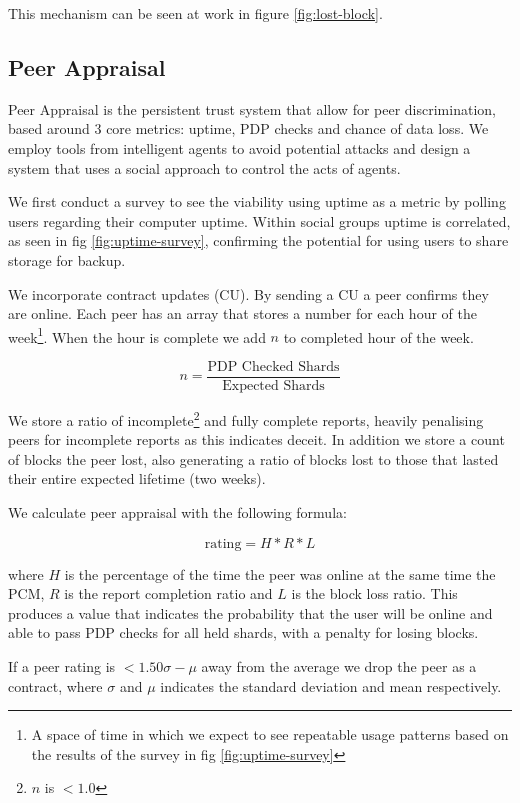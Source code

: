 \documentclass[11pt, a4paper, twocolumn, twoside]{report}
\begin{document}
This mechanism can be seen at work in figure \ref{fig:lost-block}.

\subsection{Peer Appraisal} \label{sec:peerAppraisal}

Peer Appraisal is the persistent trust system that allow for peer discrimination, based around 3 core metrics: uptime, PDP checks and chance of data loss. We employ tools from intelligent agents to avoid potential attacks and design a system that uses a social approach \citep{pinyol2013computational} to control the acts of agents.

We first conduct a survey to see the viability using uptime as a metric by polling users regarding their computer uptime. Within social groups uptime is correlated, as seen in fig \ref{fig:uptime-survey}, confirming the potential for using users to share storage for backup.

We incorporate contract updates (CU). By sending a CU a peer confirms they are online. Each peer has an array that stores a number for each hour of the week\footnote{A space of time in which we expect to see repeatable usage patterns based on the results of the survey in fig \ref{fig:uptime-survey}}. When the hour is complete we add $n$ to completed hour of the week.

$$n = \frac{\mbox{PDP Checked Shards}}{\mbox{Expected Shards}}$$

We store a ratio of incomplete\footnote{$n$ is $<1.0$} and fully complete reports, heavily penalising peers for incomplete reports as this indicates deceit. In addition we store a count of blocks the peer lost, also generating a ratio of blocks lost to those that lasted their entire expected lifetime (two weeks).

We calculate peer appraisal with the following formula:

$$\mbox{rating} = H * R * L$$

where $H$ is the percentage of the time the peer was online at the same time the PCM, $R$ is the report completion ratio and $L$ is the block loss ratio. This produces a value that indicates the probability that the user will be online and able to pass PDP checks for all held shards, with a penalty for losing blocks.

If a peer rating is $<1.50\sigma - \mu$ away from the average we drop the peer as a contract, where $\sigma$ and $\mu$ indicates the standard deviation and mean respectively.
\end{document}

